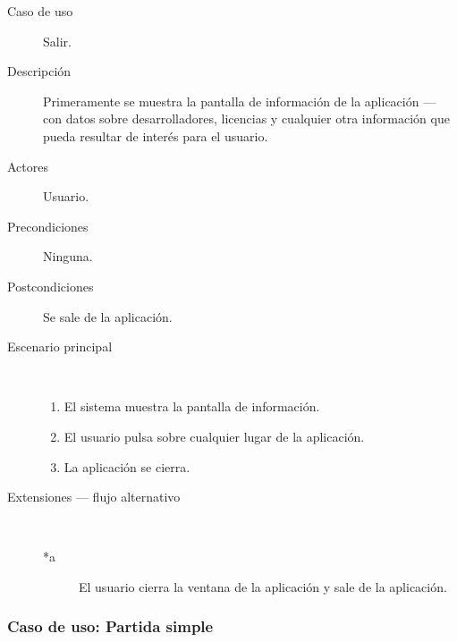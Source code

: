\begin{description}
    \item[Caso de uso] Salir.
    \item[Descripción] Primeramente se muestra la pantalla de información de la aplicación --- con datos
            sobre desarrolladores, licencias y cualquier otra información que pueda resultar de interés para
            el usuario.
    \item[Actores] Usuario.
    \item[Precondiciones] Ninguna.
    \item[Postcondiciones] Se sale de la aplicación.
    \item[Escenario principal] $\quad$
        \begin{enumerate}
            \item El sistema muestra la pantalla de información.
            \item El usuario pulsa sobre cualquier lugar de la aplicación.
            \item La aplicación se cierra.
        \end{enumerate}
    \item[Extensiones --- flujo alternativo] $\quad$
        \begin{description}
            \item[*a ] El usuario cierra la ventana de la aplicación y sale de la aplicación.
        \end{description}
\end{description}
 

\subsubsection{Caso de uso: Partida simple}

